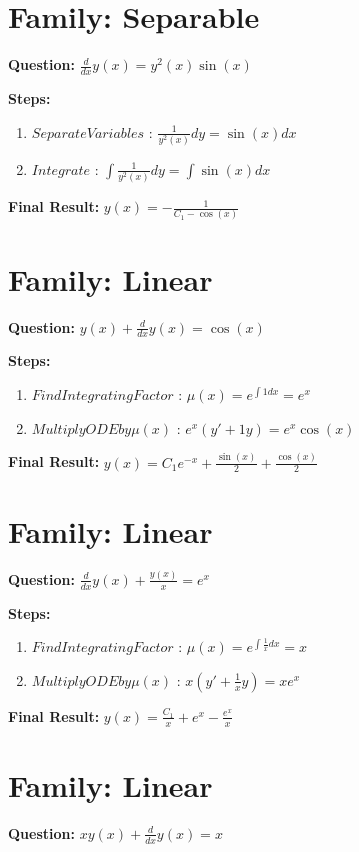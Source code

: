 \documentclass{article}
\begin{document}
\section*{Family: Separable}
\textbf{Question:} $\frac{d}{d x} y{\left(x \right)} = y^{2}{\left(x \right)} \sin{\left(x \right)}$

\textbf{Steps:}
\begin{enumerate}
\item $Separate Variables$ :  $\frac{1}{y^{2}{\left(x \right)}} dy = \sin{\left(x \right)} dx$
\item $Integrate$ :  $\int \frac{1}{y^{2}{\left(x \right)}} dy = \int \sin{\left(x \right)} dx$
\end{enumerate}
\textbf{Final Result:} $y{\left(x \right)} = - \frac{1}{C_{1} - \cos{\left(x \right)}}$

\section*{Family: Linear}
\textbf{Question:} $y{\left(x \right)} + \frac{d}{d x} y{\left(x \right)} = \cos{\left(x \right)}$

\textbf{Steps:}
\begin{enumerate}
\item $Find Integrating Factor$ :  $\mu(x) = e^{\int 1 dx} = e^{x}$
\item $Multiply ODE by \mu(x)$ :  $e^{x}(y' + 1y) = e^{x} \cos{\left(x \right)}$
\end{enumerate}
\textbf{Final Result:} $y{\left(x \right)} = C_{1} e^{- x} + \frac{\sin{\left(x \right)}}{2} + \frac{\cos{\left(x \right)}}{2}$

\section*{Family: Linear}
\textbf{Question:} $\frac{d}{d x} y{\left(x \right)} + \frac{y{\left(x \right)}}{x} = e^{x}$

\textbf{Steps:}
\begin{enumerate}
\item $Find Integrating Factor$ :  $\mu(x) = e^{\int \frac{1}{x} dx} = x$
\item $Multiply ODE by \mu(x)$ :  $x(y' + \frac{1}{x}y) = x e^{x}$
\end{enumerate}
\textbf{Final Result:} $y{\left(x \right)} = \frac{C_{1}}{x} + e^{x} - \frac{e^{x}}{x}$

\section*{Family: Linear}
\textbf{Question:} $x y{\left(x \right)} + \frac{d}{d x} y{\left(x \right)} = x$
\end{document}
